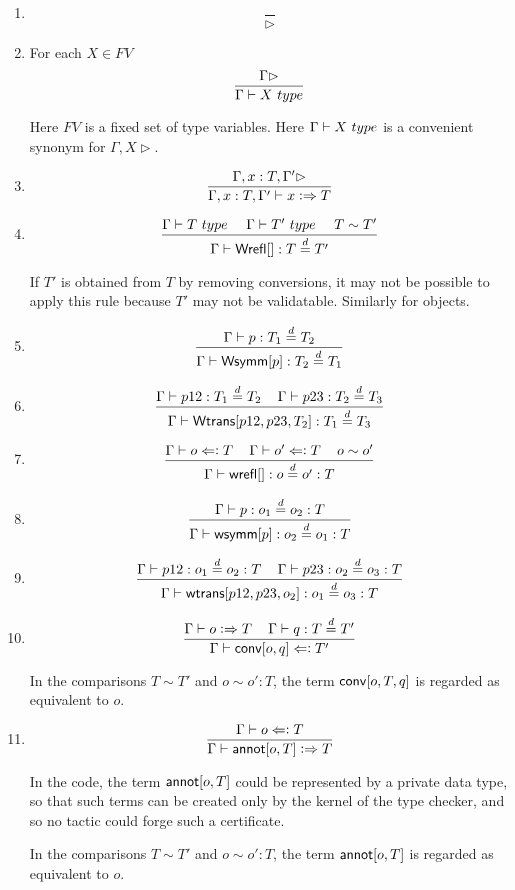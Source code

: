 \documentclass[11pt]{article}
\newcommand{\eqd}{\stackrel{d}{=}}
\newcommand{\spc}{{\,\,\,\,\,\,\,}}
\newcommand{\synth}{\vcentcolon\Rightarrow}
\newcommand{\force}{\Leftarrow\vcentcolon}
\newcommand{\Type}{\mathop{{\, \sc type}}}
\newcommand{\ha}[2]{#1[#2]}
\newcommand{\Wrefl}{{\sf Wrefl}}
\newcommand{\Wtrans}{{\sf Wtrans}}
\newcommand{\Wsymm}{{\sf Wsymm}}
\newcommand{\wrefl}{{\sf wrefl}}
\newcommand{\annot}{{\sf annot}}
\newcommand{\conv}{{\sf conv}}
\newcommand{\wsymm}{{\sf wsymm}}
\newcommand{\wtrans}{{\sf wtrans}}
\begin{document}
\begin{enumerate}

\item 
$$\frac{}{\rhd}$$

\item For each $X\in FV$
$$\frac{\Gamma\rhd}{\Gamma\vdash X \Type}$$

Here $FV$ is a fixed set of type variables.  Here $\Gamma\vdash X \Type$
is a convenient synonym for $\Gamma, X\rhd$.

\item 
$$\frac{\Gamma, x:T, \Gamma'\rhd}{\Gamma, x:T, \Gamma'\vdash x \synth T}$$

\item 
$$\frac{\Gamma \vdash T \Type\spc \Gamma \vdash T'\Type \spc T\sim T'}{\Gamma\vdash \ha\Wrefl{}: T\eqd T'}$$

If $T'$ is obtained from $T$ by removing conversions, it may not be possible to apply
this rule because $T'$ may not be validatable.  Similarly for objects.

\item 
$$\frac{\Gamma\vdash p:T_1\eqd T_2}{\Gamma\vdash \ha\Wsymm{p}:T_2\eqd T_1}$$

\item 
$$\frac{\Gamma\vdash p12:T_1\eqd T_2\spc\Gamma\vdash p23:T_2\eqd T_3}{\Gamma\vdash \ha\Wtrans{p12,p23,T_2}: T_1\eqd T_3}$$

\item 
$$\frac{\Gamma\vdash o \force T\spc\Gamma\vdash o' \force T \spc o \sim o'}{\Gamma\vdash \ha\wrefl{}:o\eqd o':T}$$

\item 
$$\frac{\Gamma\vdash p:o_1\eqd o_2:T}{\Gamma\vdash \ha\wsymm{p}:o_2\eqd o_1:T}$$

\item 
$$\frac{\Gamma\vdash p12:o_1\eqd o_2:T\spc\Gamma\vdash p23:o_2\eqd o_3:T}{\Gamma\vdash \ha\wtrans{p12,p23,o_2}:o_1\eqd o_3:T}$$

\item 
$$\frac{\Gamma\vdash o \synth T\spc \Gamma\vdash q : T\eqd T'}{\Gamma\vdash \ha\conv{o,q} \force T'}$$

In the comparisons $T\sim T'$ and $o\sim o':T$, the term $\ha\conv{o,T,q}$ is regarded as equivalent to $o$.

\item 
$$\frac{\Gamma\vdash o \force T}{\Gamma\vdash \ha\annot{o,T} \synth T}$$

In the code, the term $\ha\annot{o,T}$ could be represented by a private data
type, so that such terms can be created only by the kernel of the type checker,
and so no tactic could forge such a certificate.

In the comparisons $T\sim T'$ and $o\sim o':T$, the term $\ha\annot{o,T}$ is regarded as equivalent to $o$.

\end{enumerate}
\end{document}
